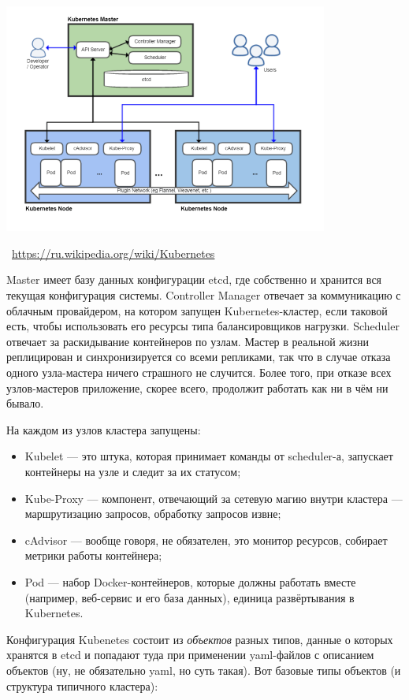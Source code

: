 \documentclass[a5paper]{article}
\newcommand{\attribution}[1] {
    \vspace{-5mm}\begin{flushright}\begin{scriptsize}\textcolor{gray}{\textcopyright\, #1}\end{scriptsize}\end{flushright}
}
\begin{document}
\begin{center}
    \includegraphics[width=0.8\textwidth]{kubernetesArchitecture.png}
    \attribution{\url{https://ru.wikipedia.org/wiki/Kubernetes}}
\end{center}

Master имеет базу данных конфигурации etcd, где собственно и хранится вся текущая конфигурация системы. Controller Manager отвечает за коммуникацию с облачным провайдером, на котором запущен Kubernetes-кластер, если таковой есть, чтобы использовать его ресурсы типа балансировщиков нагрузки. Scheduler отвечает за раскидывание контейнеров по узлам. Мастер в реальной жизни реплицирован и синхронизируется со всеми репликами, так что в случае отказа одного узла-мастера ничего страшного не случится. Более того, при отказе всех узлов-мастеров приложение, скорее всего, продолжит работать как ни в чём ни бывало.

На каждом из узлов кластера запущены:

\begin{itemize}
    \item Kubelet --- это штука, которая принимает команды от scheduler-а, запускает контейнеры на узле и следит за их статусом;
    \item Kube-Proxy --- компонент, отвечающий за сетевую магию внутри кластера --- маршрутизацию запросов, обработку запросов извне;
    \item cAdvisor --- вообще говоря, не обязателен, это монитор ресурсов, собирает метрики работы контейнера;
    \item Pod --- набор Docker-контейнеров, которые должны работать вместе (например, веб-сервис и его база данных), единица развёртывания в Kubernetes.
\end{itemize}

Конфигурация Kubenetes состоит из \emph{объектов} разных типов, данные о которых хранятся в etcd и попадают туда при применении yaml-файлов с описанием объектов (ну, не обязательно yaml, но суть такая). Вот базовые типы объектов (и структура типичного кластера):
\end{document}
